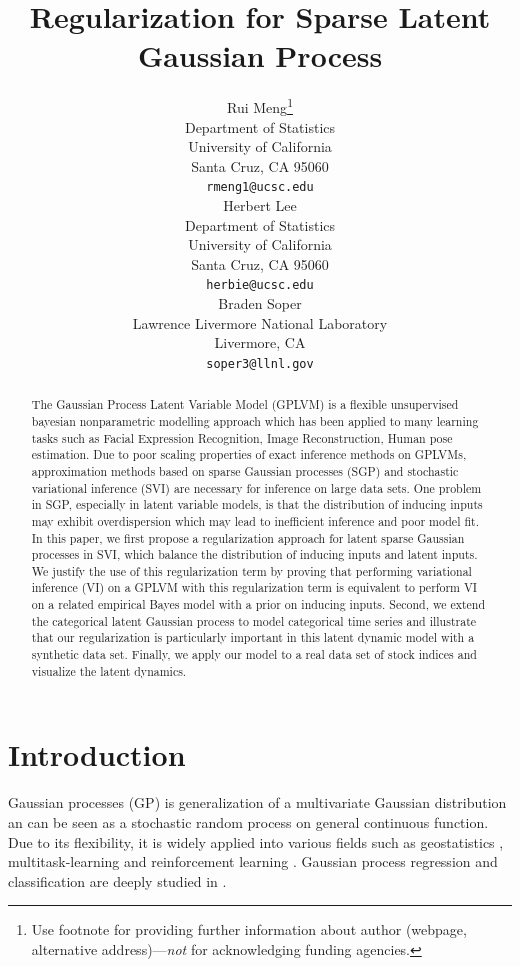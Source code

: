 \documentclass{article}
\title{Regularization for Sparse Latent Gaussian Process}
\author{%
	Rui Meng\thanks{Use footnote for providing further information
		about author (webpage, alternative address)---\emph{not} for acknowledging
		funding agencies.} \\
	Department of Statistics\\
	University of California\\
	Santa Cruz, CA 95060 \\
	\texttt{rmeng1@ucsc.edu} \\
	\And
	Herbert Lee \\
	Department of Statistics\\
	University of California\\
	Santa Cruz, CA 95060 \\
	\texttt{herbie@ucsc.edu} \\
    \And
	Braden Soper \\
	Lawrence Livermore National Laboratory \\
	Livermore, CA \\
	\texttt{soper3@llnl.gov} \\
}
\begin{document}
	
	\maketitle
	
\begin{abstract}
The Gaussian Process Latent Variable Model (GPLVM) is a flexible unsupervised bayesian nonparametric modelling approach which has been applied to many learning tasks such as Facial Expression Recognition, Image Reconstruction, Human pose estimation. Due to poor scaling properties of exact inference methods on GPLVMs, approximation methods based on sparse Gaussian processes (SGP) and stochastic variational inference (SVI) are necessary for inference on large data sets. One problem in SGP, especially in latent variable models, is that the distribution of inducing inputs may exhibit overdispersion which may lead to inefficient inference and poor model fit. In this paper, we first propose a regularization approach for latent sparse Gaussian processes in SVI, which balance the distribution of inducing inputs and latent inputs. We justify the use of this regularization term by proving that performing variational inference (VI) on a GPLVM with this regularization term is equivalent to perform VI on a related empirical Bayes model with a prior on inducing inputs. Second, we extend the categorical latent Gaussian process to model categorical time series and illustrate that our regularization is particularly important in this latent dynamic model with a synthetic data set. Finally, we apply our model to a real data set of stock indices and visualize the latent dynamics.
\end{abstract}

\section{Introduction}
Gaussian processes (GP) is generalization of a multivariate Gaussian distribution an can be seen as a stochastic random process on general continuous function. Due to its flexibility, it is widely applied into various fields such as geostatistics \citep{Cressie_1993}, multitask-learning \citep{Banerjee_2008} and reinforcement learning \citep{Rasmussen_2004}. Gaussian process regression and classification are deeply studied in \cite{Rasmussen_2005}.
\end{document}
